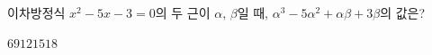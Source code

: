 이차방정식 $x^2-5x-3=0$의 두 근이 $\alpha$, $\beta$일 때, $\alpha^3-5\alpha^2+\alpha\beta+3\beta$의 값은?
\begin{choices32}{$6$}{$9$}{$12$}{$15$}{$18$}\end{choices32}
